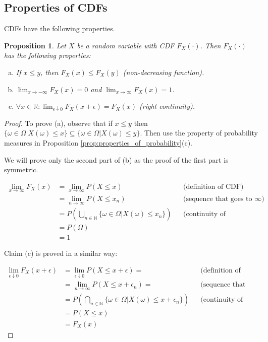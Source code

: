 \documentclass{book}
\theoremstyle{plain}%
\newtheorem{proposition}{Proposition}[section]
\theoremstyle{definition}
\newlength{\arrow}
\begin{document}
\subsection*{Properties of CDFs}

CDFs have the following properties.

\begin{proposition}
Let $X$ be a random variable with CDF $F_X(\cdot)$. Then $F_X(\cdot)$ has the following properties:
\begin{enumerate}[(a)]
\item If $x \leq y$, then $F_X(x) \leq F_X(y)$ \textit{(non-decreasing function)}.
\item $\lim_{x \rightarrow -\infty} F_X(x) = 0$ and $\lim_{x \rightarrow \infty} F_X(x) = 1$. 
\item $\forall x \in \mathbb{R}: \lim_{\epsilon \downarrow 0} F_X(x + \epsilon) = F_X(x)$ \textit{(right continuity)}.
\end{enumerate}\label{prop:CDF}
\end{proposition}

\begin{proof}
To prove (a), observe that if $x \leq y$ then $\{\omega \in \Omega | X(\omega) \leq x\} \subseteq \{\omega \in \Omega | X(\omega) \leq y\}$.   Then use the property of probability measures in Proposition \ref{prop:properties_of_probability}(c).

We will prove only the second part of (b) as the proof of the first part is symmetric.

\begin{align*}
    \lim_{x \rightarrow \infty} F_X(x) &= \lim_{x \rightarrow \infty} P(X \leq x) && \text{(definition of CDF)} \\
    &= \lim_{n \rightarrow \infty} P(X \leq x_n) && \text{(sequence that goes to $\infty$)} \\
    &= P(\bigcup_{n \in \mathbb{N}} \{\omega \in \Omega | X(\omega) \leq x_n\}) && \text{(continuity of probability)}\\ 
    &= P(\Omega) \\
    &= 1
\end{align*}

Claim (c) is proved in a similar way:

\begin{align*}
    \lim_{\epsilon \downarrow 0} F_X(x + \epsilon) &= \lim_{\epsilon \downarrow 0} P(X \leq x + \epsilon) = && \text{(definition of CDF)} \\
    &= \lim_{n \rightarrow \infty} P(X \leq x + \epsilon_n) = && \text{(sequence that goes to 0)} \\
    &= P(\bigcap_{n \in \mathbb{N}} \{\omega \in \Omega | X(\omega) \leq x + \epsilon_n\}) && \text{(continuity of probability)}\\ 
    &= P(X \leq x) \\
    &= F_X(x)
\end{align*}

\end{proof}
\end{document}
